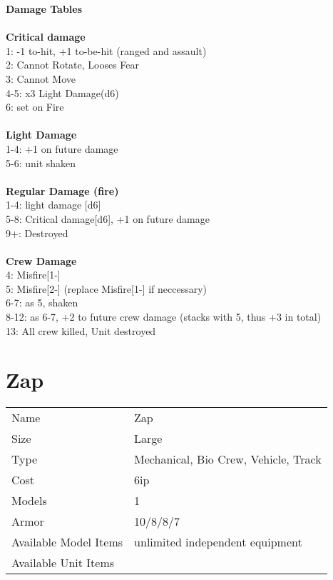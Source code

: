 {\bf Damage Tables} \\
\ \\ {\bf Critical damage } \\
1: -1 to-hit, +1 to-be-hit (ranged and assault) \\
2: Cannot Rotate, Looses Fear \\
3: Cannot Move \\
4-5: x3 Light Damage(d6) \\
6: set on Fire \\
\ \\ {\bf Light Damage } \\
1-4: +1 on future damage \\
5-6: unit shaken \\
\ \\ {\bf Regular Damage (fire) } \\
1-4: light damage [d6] \\
5-8: Critical damage[d6], +1 on future damage \\
9+: Destroyed \\
\ \\ {\bf Crew Damage } \\
4: Misfire[1-] \\
5: Misfire[2-] (replace Misfire[1-] if neccessary) \\
6-7: as 5, shaken \\
8-12: as 6-7, +2 to future crew damage (stacks with 5, thus +3 in total) \\
13: All crew killed, Unit destroyed \\









\pagebreak

\section{ Zap }

\begin{tabular}{ll}
  Name & Zap \\
  Size & Large\\
  Type & Mechanical, Bio Crew, Vehicle, Track\\
  Cost & 6ip\\
  Models & 1\\
  Armor & 10/8/8/7\\
  Available Model Items & unlimited independent equipment \\
  Available Unit Items &  \\
\end{tabular}

